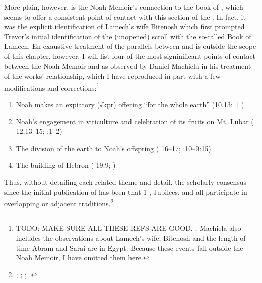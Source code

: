 More plain, however, is the Noah Memoir's connection to the book of \jub, which seems to offer a consistent point of contact with this section of the \ga.\autocite[20]{fitzmyer2004} In fact, it was the explicit identification of Lamech's wife Bitenosh which first prompted Trevor's initial identification of the (unopened) scroll with the so-called Book of Lamech.\autocite{trevor_basor1949} En exaustive treatment of the parallels between \jub and \ga is outside the scope of this chapter, however, I will list four of the most signinificant points of contact between the Noah Memoir and \jub as observed by Daniel Machiela in his treatment of the works' relationship, which I have reproduced in part with a few modifications and corrections:\footnote{TODO: MAKE SURE ALL THESE REFS ARE GOOD. \cite[13]{machiela2009}. Machiela also includes the observations about Lamech's wife, Bitenosh and the length of time Abram and Sarai are in Egypt. Because these events fall outside the Noah Memoir, I have omitted them here.}

\begin{enumerate}
	\item Noah makes an expiatory (√kpr) offering ``for the whole earth'' (10.13:  || )
    \item Noah's engagement in viticulture and celebration of its fruits on Mt. Lubar ( 12.13--15; :1--2)
    \item The division of the earth to Noah's offspring ( 16--17; :10--9:15)
    \item The building of Hebron ( 19.9; )
\end{enumerate}

Thus, without detailing each related theme and detail, the scholarly consensus since the initial publication of \ga has been that 1 \enoch, Jubilees, and \ga all participate in overlapping or adjacent traditions.\footnote{\cite[38]{avigad-yading1956}; \cite[20--22]{fitzmyer2004}; \cite[110--116]{crawford2008}; \cite[8--19]{machiela2009}.}


